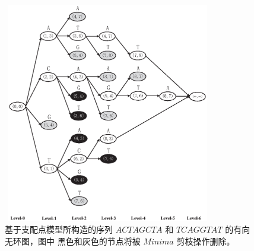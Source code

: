 \begin{figure}[!h]
  \centering
  \includegraphics[height=3.8in, width=3.6in]{figures/4_MLCS/DAG}
  \vspace{1.5em}
  \caption{基于支配点模型所构造的序列 $ACTAGCTA$ 和 $TCAGGTAT$ 的有向无环图，图中
    黑色和灰色的节点将被 $Minima$ 剪枝操作删除。}
  \label{fig:DAG}
\end{figure}


